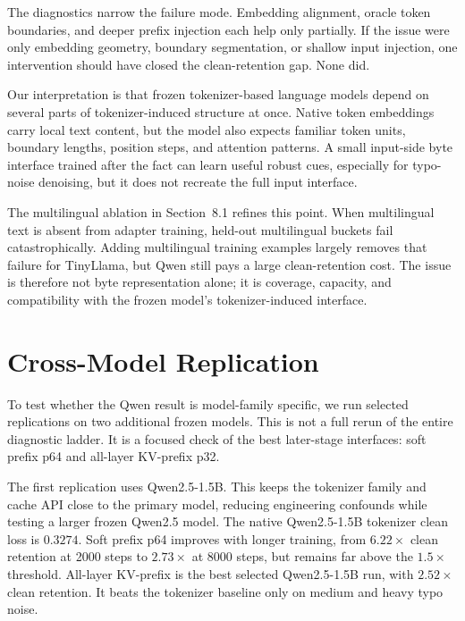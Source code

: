 \documentclass[runningheads]{llncs}
\newcommand{\qwena}{Qwen2.5-1.5B}
\begin{document}
The diagnostics narrow the failure mode. Embedding alignment, oracle token boundaries, and deeper prefix injection each help only partially. If the issue were only embedding geometry, boundary segmentation, or shallow input injection, one intervention should have closed the clean-retention gap. None did.

Our interpretation is that frozen tokenizer-based language models depend on several parts of tokenizer-induced structure at once. Native token embeddings carry local text content, but the model also expects familiar token units, boundary lengths, position steps, and attention patterns. A small input-side byte interface trained after the fact can learn useful robust cues, especially for typo-noise denoising, but it does not recreate the full input interface.

The multilingual ablation in Section~8.1 refines this point. When multilingual text is absent from adapter training, held-out multilingual buckets fail catastrophically. Adding multilingual training examples largely removes that failure for TinyLlama, but Qwen still pays a large clean-retention cost. The issue is therefore not byte representation alone; it is coverage, capacity, and compatibility with the frozen model's tokenizer-induced interface.

\section{Cross-Model Replication}

To test whether the Qwen result is model-family specific, we run selected replications on two additional frozen models. This is not a full rerun of the entire diagnostic ladder. It is a focused check of the best later-stage interfaces: soft prefix p64 and all-layer KV-prefix p32.

The first replication uses \qwena{}. This keeps the tokenizer family and cache API close to the primary model, reducing engineering confounds while testing a larger frozen Qwen2.5 model. The native \qwena{} tokenizer clean loss is $0.3274$. Soft prefix p64 improves with longer training, from $6.22\times$ clean retention at 2000 steps to $2.73\times$ at 8000 steps, but remains far above the $1.5\times$ threshold. All-layer KV-prefix is the best selected \qwena{} run, with $2.52\times$ clean retention. It beats the tokenizer baseline only on medium and heavy typo noise.
\end{document}

